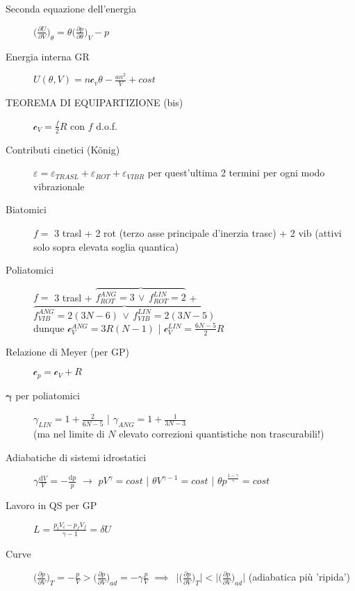 \documentclass[10pt, oneside]{article}
\begin{document}
\begin{description}
\item[Seconda equazione dell'energia] $\displaystyle \bigg(\frac{\partial U}{\partial V}\bigg)_\theta = \theta \bigg(\frac{\partial p}{\partial \theta}\bigg)_V - p$
\item[Energia interna GR] $\displaystyle U(\theta, V) = n \mathcal{c}_v \theta - \frac{a n^2}{V} + cost$ 
\item[TEOREMA DI EQUIPARTIZIONE (bis)] $\displaystyle \mathcal{c}_V = \frac{f}{2} R$ con $f$ d.o.f.
\item[Contributi cinetici (K\"onig)] $\displaystyle \varepsilon = \varepsilon_{TRASL} + \varepsilon_{ROT} + \varepsilon_{VIBR}$ per quest'ultima 2 termini per ogni modo vibrazionale
\item[Biatomici] $f = $ 3 trasl + 2 rot (terzo asse principale d'inerzia trasc) + 2 vib (attivi solo sopra elevata soglia quantica)
\item[Poliatomici] $f =$ 3 trasl + $\displaystyle \overbrace{f_{ROT}^{ANG} = 3 \, \lor \, f_{ROT}^{LIN} =2}$ + $\displaystyle  \overbrace{f_{VIB}^{ANG} = 2(3N - 6) \, \lor \, f_{VIB}^{LIN} = 2(3N - 5)}$
\\dunque $\displaystyle \mathcal{c}_V^{ANG} = 3R (N-1)$ \bigg| $\displaystyle \mathcal{c}_V^{LIN} = \frac{6N - 5}{2}R$
\item[Relazione di Meyer (per GP)] $\displaystyle \mathcal{c}_p = \mathcal{c}_V + R$
\item[$\mathbf{\gamma}$ per poliatomici] $\displaystyle \gamma_{LIN} = 1 + \frac{2}{6N - 5}$ \bigg| $\displaystyle \gamma_{ANG} = 1 + \frac{1}{3N -3}$ \\(ma nel limite di $N$ elevato correzioni quantistiche non trascurabili!)
\item[Adiabatiche di sistemi idrostatici] $\displaystyle \gamma \frac{\mathrm{d}V}{V} = - \frac{\mathrm{d}p}{p}$ $\rightarrow$ $\displaystyle pV^\gamma = cost$ \bigg| $\displaystyle \theta V^{\gamma - 1} = cost$ \bigg| $\displaystyle \theta p^{ \frac{1 - \gamma}{\gamma}} = cost$
\item[Lavoro in QS per GP]$\displaystyle L = \frac{p_i V_i - p_f V_f}{\gamma - 1} = \delta U$
\item[Curve] $\displaystyle \bigg(\frac{\partial p}{\partial V}\bigg)_T = - \frac{p}{V} > \bigg(\frac{\partial p}{\partial V}\bigg)_{ad} = - \gamma \frac{p}{V}$ $\implies \enspace \bigg|\bigg(\displaystyle \frac{\partial p}{\partial V}\bigg)_T\bigg| < \bigg|\bigg(\displaystyle \frac{\partial p}{\partial V}\bigg)_{ad}\bigg|$ (adiabatica più 'ripida')
\end{description}
\end{document}
